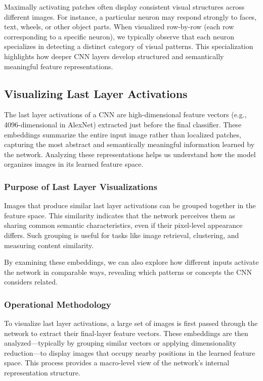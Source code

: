 \documentclass{article}
\begin{document}
Maximally activating patches often display consistent visual structures across different images. For instance, a particular neuron may respond strongly to faces, text, wheels, or other object parts. When visualized row-by-row (each row corresponding to a specific neuron), we typically observe that each neuron specializes in detecting a distinct category of visual patterns. This specialization highlights how deeper CNN layers develop structured and semantically meaningful feature representations.


\subsection{Visualizing Last Layer Activations}

The last layer activations of a CNN are high-dimensional feature vectors (e.g., 4096-dimensional in AlexNet) extracted just before the final classifier. These embeddings summarize the entire input image rather than localized patches, capturing the most abstract and semantically meaningful information learned by the network. Analyzing these representations helps us understand how the model organizes images in its learned feature space.

\subsubsection{Purpose of Last Layer Visualizations}

Images that produce similar last layer activations can be grouped together in the feature space. This similarity indicates that the network perceives them as sharing common semantic characteristics, even if their pixel-level appearance differs. Such grouping is useful for tasks like image retrieval, clustering, and measuring content similarity.

By examining these embeddings, we can also explore how different inputs activate the network in comparable ways, revealing which patterns or concepts the CNN considers related.

\subsubsection{Operational Methodology}

To visualize last layer activations, a large set of images is first passed through the network to extract their final-layer feature vectors. These embeddings are then analyzed—typically by grouping similar vectors or applying dimensionality reduction—to display images that occupy nearby positions in the learned feature space. This process provides a macro-level view of the network’s internal representation structure.
\end{document}
